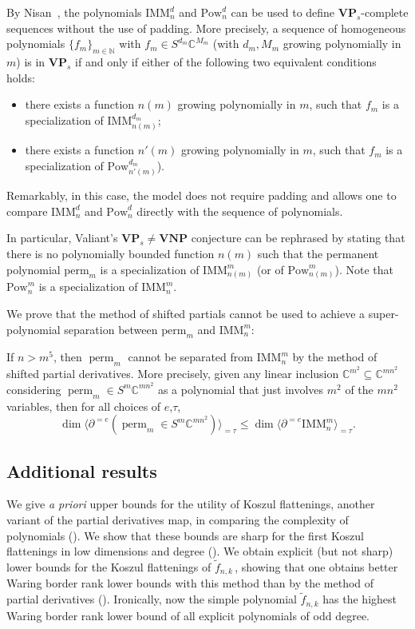 \documentclass{toc}
\newcommand{\bbC}{\mathbb{C}}
\newcommand{\bbN}{\mathbb{N}}
\renewcommand{\tilde}[1]{\widetilde{#1}}
\newcommand{\bfVNP}{\mathbf{VNP}}
\newcommand{\bfVP}{\mathbf{VP}}
\newcommand{\perm}{\mathrm{perm}}
\newcommand{\Pow}{\mathrm{Pow}}
\def\BC{\mathbb C}
\def\t{\tau}
\def\tperm{\operatorname{perm}}
\def\tdim{\operatorname{dim}}
\newcommand{\IMM}{\mathrm{IMM}}
\begin{document}
By %
Nisan~\cite{Nisan:1991:LBN:103418.103462},  %
the polynomials $\IMM^d_n$ and $\Pow^d_n$ can be used to define $\bfVP_s$-complete sequences without the use of padding. More precisely, a sequence of
homogeneous polynomials $\{ f_m \}_{m \in \bbN}$ with
$f_m \in S^{d_m} \bbC^{M_m}$ (with $d_m, M_m$ growing polynomially in $m$)
is in $\bfVP_s$ if and only if
%
%
%
%
%
%
%
%
either of the following two equivalent conditions holds:
\begin{itemize}
  \item there exists a function $n(m)$
%
growing polynomially in $m$, such that $f_m$ is
a specialization of $\IMM^{d_m}_{n(m)}$;
%
  \item there exists a function $n'(m)$
growing polynomially in $m$, such that $f_m$ is
a specialization of $\Pow^{d_m}_{n'(m)}$).
\end{itemize}
%
Remarkably, in this case, the model does not require padding and allows
one to compare $\IMM^d_n$ and $\Pow^d_n$ directly with the sequence of
polynomials.


In particular, Valiant's $\bfVP_s \neq \bfVNP$ conjecture can be rephrased by stating that there is no polynomially bounded function $n(m)$ such that the permanent polynomial $\perm_m$ is a specialization of $\IMM^m_{n(m)}$ (or of $\Pow^m_{n(m)}$). Note that $\Pow^m_n$ is a specialization of $\IMM^m_n$. 

We prove that the method of shifted partials cannot be used to achieve a super-polynomial separation between $\perm_m$ and $\IMM^m_n$: 

\begin{theorem}\label{noshiftthm}
  If $n> m^5$, then $\tperm_m$ cannot be separated from $\IMM^m_{n}$ by the method of shifted partial derivatives. More precisely, given any linear inclusion $\BC^{m^2}\subseteq \BC^{ {m} n^2}$ considering $\tperm_m\in S^m\BC^{ {m} n^2}$ as a polynomial that just involves $m^2$ of the $m n^2$ variables, then for all choices of $e$,$\t$,
  \[
    \tdim  \langle \partial^{=e}(\tperm_m\in S^m\BC^{ {m}n^2})\rangle_{=\t}\leq \tdim  \langle \partial^{=e}\IMM^m_n\rangle_{=\t}.
  \]
\end{theorem} 

 
 
 \subsection*{Additional results} We give \emph{a priori} upper bounds for the utility of Koszul flattenings, another variant of the partial derivatives map, in comparing the complexity of polynomials (). We show that these bounds are sharp for the first Koszul flattenings in low dimensions and degree (). We  obtain explicit (but not sharp) lower bounds for the Koszul flattenings of $\tilde f_{n,k}$\,, showing that one obtains better Waring border rank lower bounds with this method than by the method of partial derivatives (). Ironically, now the simple polynomial $\tilde f_{n,k}$ has the highest Waring  border rank lower bound of all explicit polynomials of odd degree.
 
\end{document}
